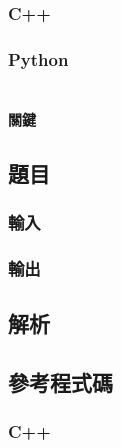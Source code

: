 \documentclass[a4paper,10pt]{article}
\begin{document}
\subsubsection{C++}

%

\subsubsection{Python}

%

\section{}

\paragraph{關鍵}

\subsection{題目}



\subsubsection{輸入}



\subsubsection{輸出}



\subsection{解析}



\subsection{參考程式碼}

\subsubsection{C++}

%
\end{document}
